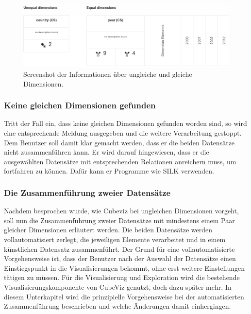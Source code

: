 \documentclass[11pt]{article}
\newcommand{\com}[1]{\marginpar{\em {\small{#1}}}} %
\begin{document}
\newpage

%
%
\begin{figure}[h!]
    \centering
    \includegraphics[width=14.3cm]{UserInterfaceMergeDatasets/DimensionsOverview.pdf}
    \caption{Screenshot der Informationen über ungleiche und gleiche Dimensionen.}
    \label{fig:UserInterfaceMergeDatasets_DimensionsOverview}
\end{figure}


%
%
\subsubsection{Keine gleichen Dimensionen gefunden}

Tritt der Fall ein, dass keine gleichen Dimensionen gefunden worden sind,\com{Anforderung \\ F-302, S. \pageref{req:F302}} so wird eine entsprechende Meldung ausgegeben und die weitere Verarbeitung gestoppt. Dem Benutzer soll damit klar gemacht werden, dass er die beiden Datensätze nicht zusammenführen kann. Er wird darauf hingewiesen, dass er die ausgewählten Datensätze mit entsprechenden Relationen anreichern muss, um fortfahren zu können. Dafür kann er Programme wie SILK\cite{SILK} verwenden.

%
%
\subsubsection{Die Zusammenführung zweier Datensätze}

Nachdem besprochen wurde, wie Cubeviz bei ungleichen Dimensionen vorgeht, soll nun die Zusammenführung zweier Datensätze mit mindestens einem Paar gleicher Dimensionen erläutert werden. Die beiden Datensätze werden vollautomatisiert zerlegt, die jeweiligen Elemente verarbeitet und in einem künstlichen Datensatz zusammenführt. Der Grund für eine vollautomatisierte Vorgehensweise ist, dass der Benutzer nach der Auswahl der Datensätze einen Einstiegspunkt in die Visualisierungen bekommt, ohne erst weitere Einstellungen tätigen zu müssen. Für die Visualisierung und Exploration wird die bestehende Visualisierungskomponente von CubeViz genutzt, doch dazu später mehr. In diesem Unterkapitel wird die prinzipielle Vorgehensweise bei der automatisierten Zusammenführung beschrieben und welche Änderungen damit einhergingen.
\end{document}
